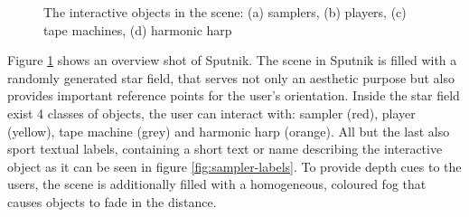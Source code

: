 \documentclass[10pt,a4paper]{scrartcl}
\begin{document}
\begin{figure}[hbtp]
\begin{center}
\caption{The interactive objects in the scene: (a) samplers, (b) players, (c) tape machines, (d) harmonic harp}
\label{fig:screen-shot-overview}
\end{center}
\end{figure}


Figure \ref{fig:screen-shot-overview} shows an overview shot of Sputnik. The scene in Sputnik is filled with a randomly generated star field, that serves not only an aesthetic purpose but also provides important reference points for the user's orientation. Inside the star field exist 4 classes of objects, the user can interact with: sampler (red), player (yellow), tape machine (grey) and harmonic harp (orange). All but the last also sport textual labels, containing a short text or name describing the interactive object as it can be seen in figure \ref{fig:sampler-labels}. To provide depth cues to the users, the scene is additionally filled with a homogeneous, coloured fog that causes objects to fade in the distance.
\end{document}
